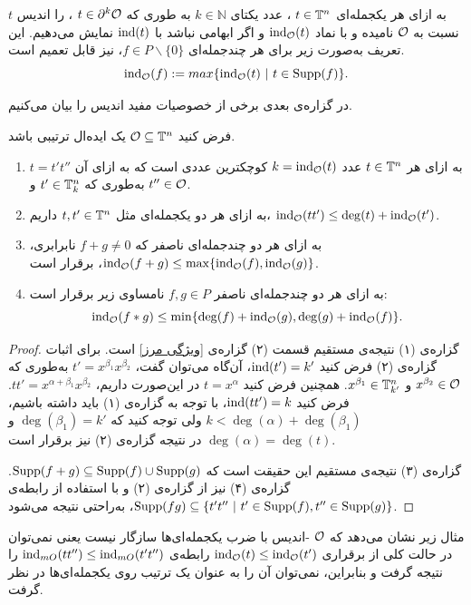 \begin{definition}
به ازای هر یکجمله‌ای 
$t\in{\mathbb{T}}^{n}$
، عدد یکتای 
$k\in\mathbb{N}$
به طوری که 
$t\in\partial^{k}\mathcal{O}$
، را اندیس 
$t$
نسبت به 
${\mathcal O}$
نامیده و با نماد 
$\operatorname{\mathrm{ind}}_{{\mathcal O}}(t)$
و اگر ابهامی نباشد با 
$\operatorname{\mathrm{ind}}(t)$
نمایش  می‌دهیم. این تعریف به‌صورت زیر برای هر چندجمله‌ای 
$f\in P\backslash\{0\}$،
نیز قابل تعمیم است.
$$\operatorname{\mathrm{ind}}_{{\mathcal O}}(f):=max\{\operatorname{\mathrm{ind}}_{{\mathcal O}}(t) \ | \ t\in \operatorname{\mathrm{Supp}}(f)\}.$$
\end{definition}
 در گزاره‌ی بعدی برخی از خصوصیات مفید اندیس  را بیان می‌کنیم.
\begin{proposition}
	\label{index propertice lemma}
فرض کنید 
${\mathcal O}\subseteq{\mathbb{T}}^{n}$
یک ایده‌ال ترتیبی باشد.
\begin{enumerate}
\item
به ازای هر 
$t\in{\mathbb{T}}^{n}$
عدد 
$k = \operatorname{\mathrm{ind}}_{{\mathcal O}}(t)$
کوچکترین عددی است که به ازای آن 
$t = t't'' $
به‌طوری که 
$t'\in{\mathbb{T}}^{n}_{k}$
و 
$t''\in{\mathcal O}$.
\item
به ازای هر دو یکجمله‌ای مثل 
$t,t'\in{\mathbb{T}}^{n}$
داریم، 
$\operatorname{\mathrm{ind}}_{{\mathcal O}}(tt')\leq \deg(t) + \operatorname{\mathrm{ind}}_{{\mathcal O}}(t')$.
\item
به ازای هر دو چندجمله‌ای ناصفر که 
$f+g\neq 0$
نابرابری،
$\operatorname{\mathrm{ind}}_{{\mathcal O}}(f + g)\leq \max\{\operatorname{\mathrm{ind}}_{{\mathcal O}}(f),\operatorname{\mathrm{ind}}_{{\mathcal O}}(g)\}$،
برقرار است.
\item
به ازای هر دو چندجمله‌ای ناصفر 
$f,g\in P$
نامساوی زیر برقرار است:
$$\operatorname{\mathrm{ind}}_{{\mathcal O}}(f*g)\leq \min\{\deg(f) + \operatorname{\mathrm{ind}}_{{\mathcal O}}(g), \deg(g) + \operatorname{\mathrm{ind}}_{{\mathcal O}}(f)\}.$$
\end{enumerate}
\end{proposition}
\begin{proof}
گزاره‌ی (۱) نتیجه‌ی مستقیم قسمت (۲) گزاره‌ی 
\ref{ویژگی مرز}
است. برای اثبات گزاره‌ی (۲) فرض کنید
$\operatorname{\mathrm{ind}}(t') = k'$،
آن‌گاه می‌توان گفت، 
$t' =  x^{\beta_{1}}x^{\beta_{2}}$
به‌طوری که 
$x^{\beta_{2}}\in{\mathcal O}$
و 
$x^{\beta_{1}}\in{\mathbb{T}}^{n}_{k'}$.
همچنین فرض کنید 
$t = x^{\alpha}$
در این‌صورت داریم،
$tt' = x^{\alpha + \beta_{1}}x^{\beta_{2}}$.
فرض کنید 
$\operatorname{\mathrm{ind}}(tt') = k$،
با توجه به گزاره‌ی (۱) باید داشته باشیم، 
$k < \deg(\alpha) + \deg(\beta_{1})$
ولی توجه کنید که 
$\deg(\beta_{1}) = k'$
و
$\deg(\alpha) = \deg(t)$
در نتیجه گزاره‌ی (۲) نیز برقرار است. 

گزاره‌ی (۳) نتیجه‌ی مستقیم این حقیقت است که 
$\operatorname{\mathrm{Supp}}(f+g)\subseteq \operatorname{\mathrm{Supp}}(f)\cup \operatorname{\mathrm{Supp}}(g)$.
گزاره‌ی (۴) نیز از گزاره‌ی (۲) و با استفاده از رابطه‌ی 
$\operatorname{\mathrm{Supp}}(fg)\subseteq\{t't''\ | \ t'\in \operatorname{\mathrm{Supp}}(f), t''\in \operatorname{\mathrm{Supp}}(g)\}$،
به‌راحتی نتیجه می‌شود.
\end{proof}

مثال زیر نشان می‌دهد که 
${\mathcal O}$
-اندیس  با ضرب یکجمله‌ای‌ها سازگار نیست یعنی نمی‌توان در حالت کلی از برقراری 
$\operatorname{\mathrm{ind}}_{{\mathcal O}}(t)\leq \operatorname{\mathrm{ind}}_{{\mathcal O}}(t')$
رابطه‌ی 
$\operatorname{\mathrm{ind}}_{mO}(tt'')\leq\operatorname{\mathrm{ind}}_{mO}(t't'')$
را نتیجه گرفت و بنابراین، نمی‌توان آن را به عنوان یک ترتیب روی یکجمله‌ای‌ها در نظر گرفت.

